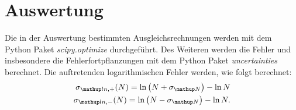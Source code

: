 \section{Auswertung}

Die in der Auswertung bestimmten Ausgleichsrechnungen werden mit
dem Python Paket \emph{scipy.optimize}\cite{scipy} durchgeführt.
Des Weiteren werden die Fehler und insbesondere die Fehlerfortpflanzungen
mit dem Python Paket \emph{uncertainties}\cite{uncertainties} berechnet.
Die auftretenden logarithmischen Fehler werden, wie folgt berechnet:
\begin{align}
  \label{eq:log_fehler}
  \begin{aligned}
    \sigma\ua{ln,+}(N)=\ln{\left(N+\sigma\ua{N}\right)}-\ln{N}\\%
    \sigma\ua{ln,-}(N)=\ln{\left(N-\sigma\ua{N}\right)}-\ln{N}.
  \end{aligned}
\end{align}
